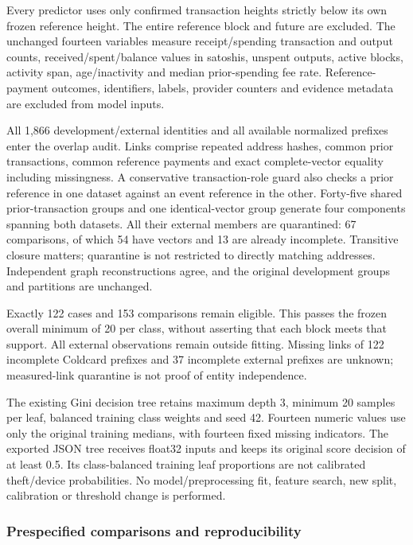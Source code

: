 Every predictor uses only confirmed transaction heights strictly below
its own frozen reference height. The entire reference block and future
are excluded. The unchanged fourteen variables measure receipt/spending
transaction and output counts, received/spent/balance values in
satoshis, unspent outputs, active blocks, activity span, age/inactivity
and median prior-spending fee rate. Reference-payment outcomes,
identifiers, labels, provider counters and evidence metadata are
excluded from model inputs.

All 1,866 development/external identities and all available normalized
prefixes enter the overlap audit. Links comprise repeated address
hashes, common prior transactions, common reference payments and exact
complete-vector equality including missingness. A conservative
transaction-role guard also checks a prior reference in one dataset
against an event reference in the other. Forty-five shared
prior-transaction groups and one identical-vector group generate four
components spanning both datasets. All their external members are
quarantined: 67 comparisons, of which 54 have vectors and 13 are already
incomplete. Transitive closure matters; quarantine is not restricted to
directly matching addresses. Independent graph reconstructions agree,
and the original development groups and partitions are unchanged.

Exactly 122 cases and 153 comparisons remain eligible. This passes the
frozen overall minimum of 20 per class, without asserting that each
block meets that support. All external observations remain outside
fitting. Missing links of 122 incomplete Coldcard prefixes and 37
incomplete external prefixes are unknown; measured-link quarantine is
not proof of entity independence.

The existing Gini decision tree retains maximum depth 3, minimum 20
samples per leaf, balanced training class weights and seed 42. Fourteen
numeric values use only the original training medians, with fourteen
fixed missing indicators. The exported JSON tree receives float32 inputs
and keeps its original score decision of at least 0.5. Its
class-balanced training leaf proportions are not calibrated theft/device
probabilities. No model/preprocessing fit, feature search, new split,
calibration or threshold change is performed.

\subsubsection{Prespecified comparisons and
reproducibility}\label{prespecified-comparisons-and-reproducibility}

